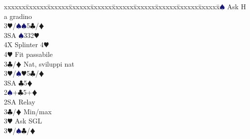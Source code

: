 \documentclass[a4paper,italian]{article}
\newcommand{\BC}{\textcolor{OliveGreen}{$\clubsuit$}}
\newcommand{\BD}{\textcolor{RedOrange}{$\vardiamondsuit$}}
\newcommand{\BH}{\textcolor{Red2}{$\varheartsuit${}}}
\newcommand{\BS}{\textcolor{MidnightBlue}{$\spadesuit${}}}
\newenvironment{bidtable}
{\begin{tabbing}

    xxxxxx\=xxxxxx\=xxxxxx\=xxxxxx\=xxxxxx\=xxxxxx\=xxxxxx\=xxxxxx\=xxxxxx\=xxxxxx\=\kill}
{\end{tabbing} }%
\begin{document}
\begin{multicols}{2}
\begin{bidtable}
                                            3\BS \> Ask H a gradino\-\\
                                            3\BH/\BS {}\BS 5\BC /\BD \\
                                            3SA \BS 332\BH \\
                                            4X \> Splinter 4\BH \\
                                            4\BH \> Fit passabile\-\\
                                            3\BC/\BD \> Nat, sviluppi nat\\
                                            3\BH/\BS {}\BH 5\BC /\BD \\
                                            3SA \BC 5\BD \-\\
                                            2\BS {}+\BC 5+\BD \+\\
                                            2SA \> Relay\+\\
                                            3\BC/\BD \> Min/max\+\\
                                            3\BH \> Ask SGL\-\\
                                            3\BH/\BS {}\BC /\BD
                                        \end{bidtable}
                                    \end{multicols}
\end{document}
